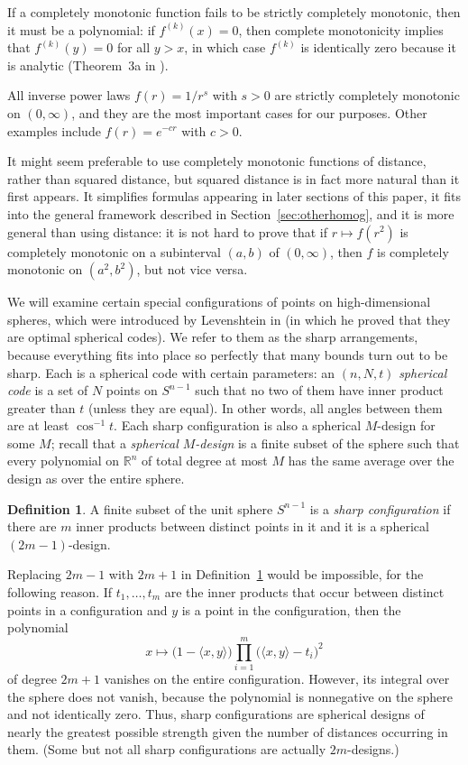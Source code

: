 \documentclass{jams-l}
\theoremstyle{plain}
\numberwithin{theorem}{section}
\theoremstyle{definition}
\newtheorem{definition}[theorem]{Definition}
\numberwithin{equation}{section}
\newcommand{\R}{{\mathbb R}}
\begin{document}
If a completely monotonic function fails to be strictly completely
monotonic, then it must be a polynomial: if $f^{(k)}(x)=0$, then
complete monotonicity implies that $f^{(k)}(y)=0$ for all $y>x$,
in which case $f^{(k)}$ is identically zero because it is analytic
(Theorem~3a in \cite[p.~146]{W}).

All inverse power laws $f(r) = 1/r^s$ with $s>0$ are strictly
completely monotonic on $(0,\infty)$, and they are the most
important cases for our purposes.  Other examples include $f(r) =
e^{-cr}$ with $c>0$.

It might seem preferable to use completely monotonic functions of
distance, rather than squared distance, but squared distance is in
fact more natural than it first appears. It simplifies formulas
appearing in later sections of this paper, it fits into the
general framework described in Section~\ref{sec:otherhomog}, and
it is more general than using distance: it is not hard to prove
that if $r \mapsto f(r^2)$ is completely monotonic on a
subinterval $(a,b)$ of $(0,\infty)$, then $f$ is completely
monotonic on $(a^2,b^2)$, but not vice versa.

We will examine certain special configurations of points on
high-dimensional spheres, which were introduced by Levenshtein in
\cite{L2} (in which he proved that they are optimal spherical
codes). We refer to them as the sharp arrangements, because
everything fits into place so perfectly that many bounds turn out
to be sharp. Each is a spherical code with certain parameters: an
$(n,N,t)$ \textit{spherical code\/} is a set of $N$ points on
$S^{n-1}$ such that no two of them have inner product greater than
$t$ (unless they are equal).  In other words, all angles between
them are at least $\cos^{-1} t$.  Each sharp configuration is also
a spherical $M$-design for some $M$; recall that a
\textit{spherical $M$-design\/} is a finite subset of the sphere
such that every polynomial on $\R^n$ of total degree at most $M$
has the same average over the design as over the entire sphere.

\begin{definition} \label{def:sharp}
A finite subset of the unit sphere $S^{n-1}$ is a \textit{sharp
configuration\/} if there are $m$ inner products between distinct
points in it and it is a spherical $(2m-1)$-design.
\end{definition}

Replacing $2m-1$ with $2m+1$ in Definition~\ref{def:sharp} would
be impossible, for the following reason.  If $t_1,\dots,t_m$ are
the inner products that occur between distinct points in a
configuration and $y$ is a point in the configuration, then the
polynomial
$$
x \mapsto \big(1-\langle x,y\rangle\big) \prod_{i=1}^m
\big(\langle x,y \rangle - t_i\big)^2
$$
of degree $2m+1$ vanishes on the entire configuration.  However,
its integral over the sphere does not vanish, because the
polynomial is nonnegative on the sphere and not identically zero.
Thus, sharp configurations are spherical designs of nearly the
greatest possible strength given the number of distances occurring
in them. (Some but not all sharp configurations are actually
$2m$-designs.)
\end{document}
